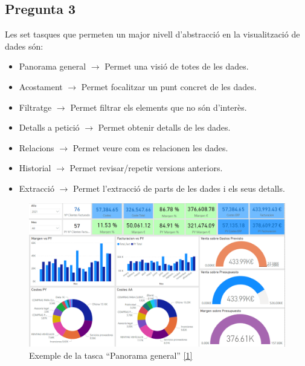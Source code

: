 \documentclass[a4paper,12pt]{report}
\begin{document}
\subsection*{Pregunta 3}
Les set tasques que permeten un major nivell d'abstracció en la visualització de dades són:
\begin{itemize}
    \item Panorama general $\rightarrow$ Permet una visió de totes de les dades.
    \item Acostament $\rightarrow$ Permet focalitzar un punt concret de les dades.
    \item Filtratge $\rightarrow$ Permet filtrar els elements que no són d'interès.
    \item Detalls a petició $\rightarrow$ Permet obtenir detalls de les dades.
    \item Relacions $\rightarrow$ Permet veure com es relacionen les dades.
    \item Historial $\rightarrow$ Permet revisar/repetir versions anteriors.
    \item Extracció $\rightarrow$ Permet l'extracció de parts de les dades i els seus detalls.
\end{itemize}
\begin{figure}[H]
    \centering
    \includegraphics[scale = 0.2]{images/dashboard_ventas.png}
    \caption{Exemple de la tasca ``Panorama general'' \protect\hyperlink{ref:biblio-pan-gen}{[1]}}
    \label{fig:panorama_general}
\end{figure}
\end{document}
